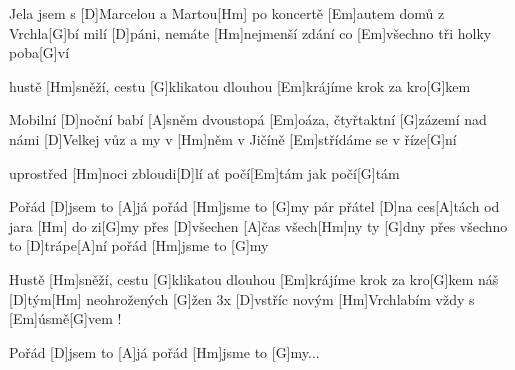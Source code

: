 
Jela jsem s [D]Marcelou a Martou[Hm]\null
po koncertě [Em]autem domů z Vrchla[G]bí
milí [D]páni, nemáte [Hm]nejmenší zdání
co [Em]všechno tři holky poba[G]ví

hustě [Hm]sněží, cestu [G]klikatou dlouhou
[Em]krájíme krok za kro[G]kem

Mobilní [D]noční babí [A]sněm
dvoustopá [Em]oáza, čtyřtaktní [G]zázemí
nad námi [D]Velkej vůz a my v [Hm]něm
v Jičíně [Em]střídáme se v říze[G]ní

uprostřed [Hm]noci zbloudi[D]lí
ať počí[Em]tám jak počí[G]tám

Pořád [D]jsem to [A]já
pořád [Hm]jsme to [G]my
pár přátel [D]na ces[A]tách
od jara [Hm] do zi[G]my
přes [D]všechen [A]\null čas
všech[Hm]ny ty [G]dny
přes všechno to [D]trápe[A]ní
pořád [Hm]jsme to [G]my

Hustě [Hm]sněží, cestu [G]klikatou dlouhou
[Em]krájíme krok za kro[G]kem
náš [D]tým[Hm] neohrožených [G]\null žen 3x
[D]vstříc novým [Hm]Vrchlabím
vždy s [Em]\null úsmě[G]vem !

Pořád [D]jsem to [A]já
pořád [Hm]jsme to [G]my...

